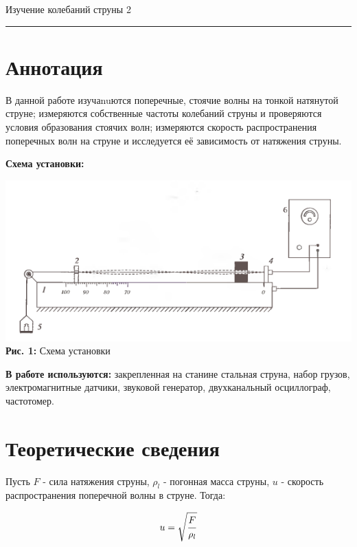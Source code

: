 \documentclass[12pt,a4paper]{scrartcl}
\begin{document}
	
	\begin{flushleft}
		\footnotesize{Изучение колебаний струны} \hspace{\fill} \footnotesize{2}
		\\[-0.3cm]\noindent\rule{\textwidth}{0.3pt}
	\end{flushleft}
	
	\section{Аннотация}
	
	В данной работе изучаnuются поперечные, стоячие волны на тонкой натянутой струне; измеряются собственные частоты колебаний струны и проверяются условия образования стоячих волн; измеряются скорость распространения поперечных волн на струне и исследуется её зависимость от натяжения струны.
	
	\textbf{Схема установки:}
	\begin{center}
		\includegraphics[scale=2]{PIC_1.png}
		\\\textbf{Рис. 1:} Схема установки
	\end{center}
	
	
	\textbf{В работе используются:} закрепленная на станине стальная струна, набор грузов, электромагнитные датчики, звуковой генератор, двухканальный осциллограф, частотомер.
	
	
	\section{Теоретические сведения}
	
	Пусть $F$ - сила натяжения струны, $\rho_l$ - погонная масса струны, $u$ - скорость распространения поперечной волны в струне. Тогда:
	
	\begin{equation}
		u = \sqrt{\dfrac{\strut F}{\strut \rho_l}}
	\end{equation}
	
\end{document}

